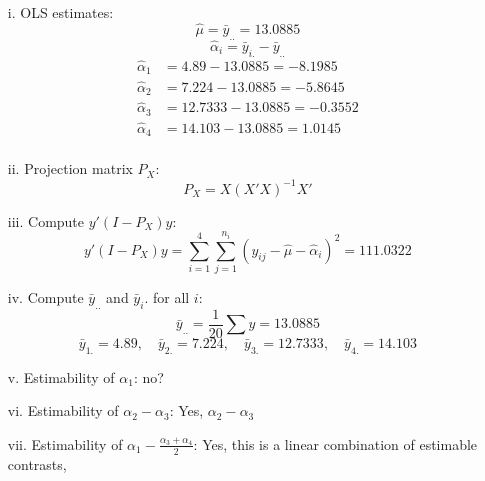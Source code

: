 \documentclass[10pt, oneside]{article}
\begin{document}
\begin{itemize}
	      \begin{itemize}
		      \item[i.] OLS estimates:
		            \[
			            \hat{\mu} = \bar{y}_{..} = 13.0885
		            \]
		            \[
			            \hat{\alpha}_i = \bar{y}_{i.} - \bar{y}_{..}
		            \]
		            \[
			            \begin{aligned}
				            \hat{\alpha}_1 & = 4.89 - 13.0885 = -8.1985    \\
				            \hat{\alpha}_2 & = 7.224 - 13.0885 = -5.8645   \\
				            \hat{\alpha}_3 & = 12.7333 - 13.0885 = -0.3552 \\
				            \hat{\alpha}_4 & = 14.103 - 13.0885 = 1.0145   \\
			            \end{aligned}
		            \]
		      \item[ii.] Projection matrix $P_X$:
		            \[
			            P_X = X (X'X)^{-1} X'
		            \]
		      \item[iii.] Compute $y'(I - P_X)y$:
		            \[
			            y'(I - P_X)y = \sum_{i=1}^4 \sum_{j=1}^{n_i} (y_{ij} - \hat{\mu} - \hat{\alpha}_i)^2 = 111.0322
		            \]
		      \item[iv.] Compute $\bar{y}_{..}$ and $\bar{y}_i.$ for all $i$:
		            \[
			            \bar{y}_{..} = \frac{1}{20} \sum y = 13.0885
		            \]
		            \[
			            \bar{y}_{1.} = 4.89, \quad \bar{y}_{2.} = 7.224, \quad \bar{y}_{3.} = 12.7333, \quad \bar{y}_{4.} = 14.103
		            \]
		      \item[v.] Estimability of $\alpha_1$:
		            no?
		      \item[vi.] Estimability of $\alpha_2 - \alpha_3$:
		            Yes, \(\alpha_2 - \alpha_3\)
		      \item[vii.] Estimability of $\alpha_1 - \frac{\alpha_3 + \alpha_4}{2}$:
		            Yes, this is a linear combination of estimable contrasts,
	      \end{itemize}
\end{itemize}
\end{document}
